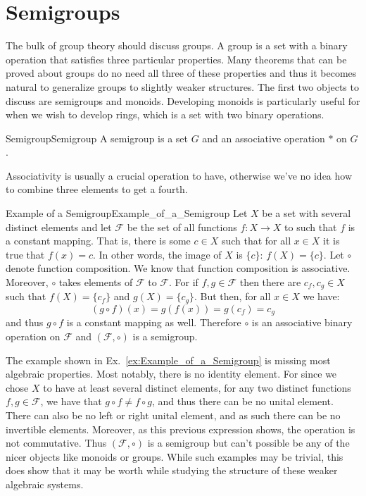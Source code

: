 \section{Semigroups}
    The bulk of group theory should discuss groups. A group is a set with a
    binary operation that satisfies three particular
    properties. Many theorems that can be proved about groups do no need all
    three of these properties and thus it becomes natural to generalize groups
    to slightly weaker structures. The first two objects to discuss are
    semigroups and monoids. Developing monoids is particularly useful for when
    we wish to develop rings, which is a set with two binary operations.
    \begin{fdefinition}{Semigroup}{Semigroup}
        A \gls{semigroup} is a set $G$ and an \gls{associative operation} $*$
        on $G$.
    \end{fdefinition}
    Associativity is usually a crucial operation to have, otherwise we've no
    idea how to combine three elements to get a fourth.
    \begin{fexample}{Example of a Semigroup}{Example_of_a_Semigroup}
        Let $X$ be a set with several distinct elements and let $\mathscr{F}$ be
        the set of all functions $f:X\rightarrow{X}$ to such that $f$ is a
        constant mapping. That is, there is some $c\in{X}$ such that for all
        $x\in{X}$ it is true that $f(x)=c$. In other words, the image of $X$ is
        $\{c\}$: $f(X)=\{c\}$. Let $\circ$ denote function composition. We know
        that function composition is associative. Moreover, $\circ$ takes
        elements of $\mathscr{F}$ to $\mathscr{F}$. For if $f,g\in\mathscr{F}$
        then there are $c_{f},c_{g}\in{X}$ such that $f(X)=\{c_{f}\}$ and
        $g(X)=\{c_{g}\}$. But then, for all $x\in{X}$ we have:
        \begin{equation}
            (g\circ{f})(x)=g(f(x))=g(c_{f})=c_{g}
        \end{equation}
        and thus $g\circ{f}$ is a constant mapping as well. Therefore $\circ$ is
        an associative binary operation on $\mathscr{F}$ and
        $(\mathscr{F},\circ)$ is a semigroup.
    \end{fexample}
    The example shown in Ex.~\ref{ex:Example_of_a_Semigroup} is missing most
    algebraic properties. Most notably, there is no identity element. For since
    we chose $X$ to have at least several distinct elements, for any two
    distinct functions $f,g\in\mathscr{F}$, we have that
    $g\circ{f}\ne{f}\circ{g}$, and thus there can be no unital element. There
    can also be no left or right unital element,
    and as such there can be no invertible elements. Moreover, as this previous
    expression shows, the operation is not commutative. Thus
    $(\mathscr{F},\circ)$ is a semigroup but can't possible be any of the nicer
    objects like monoids or groups. While such examples may be trivial, this
    does show that it may be worth while studying the structure of these weaker
    algebraic systems.